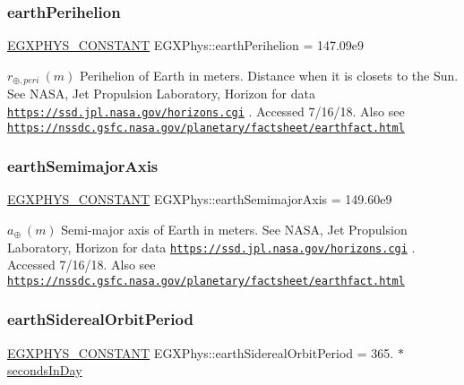 \subsubsection{\texorpdfstring{earth\+Perihelion}{earthPerihelion}}
{\footnotesize\ttfamily \mbox{\hyperlink{group___e_g_x_phys-_constants-_macros_ga76980d288494ce1714c9ac68a95ba702}{E\+G\+X\+P\+H\+Y\+S\+\_\+\+C\+O\+N\+S\+T\+A\+NT}} E\+G\+X\+Phys\+::earth\+Perihelion = 147.\+09e9}

$ r_{\oplus,peri} \ (m)$ Perihelion of Earth in meters. Distance when it is closets to the Sun. See N\+A\+SA, Jet Propulsion Laboratory, Horizon for data \href{https://ssd.jpl.nasa.gov/horizons.cgi}{\tt https\+://ssd.\+jpl.\+nasa.\+gov/horizons.\+cgi} . Accessed 7/16/18. Also see \href{https://nssdc.gsfc.nasa.gov/planetary/factsheet/earthfact.html}{\tt https\+://nssdc.\+gsfc.\+nasa.\+gov/planetary/factsheet/earthfact.\+html} \mbox{\label{group___e_g_x_phys-_constants-_astrophysics-_solar_system-_earth-_orbit_ga639f4ec7fb96c7750f22bfa1bc3a91f9}} 
\subsubsection{\texorpdfstring{earth\+Semimajor\+Axis}{earthSemimajorAxis}}
{\footnotesize\ttfamily \mbox{\hyperlink{group___e_g_x_phys-_constants-_macros_ga76980d288494ce1714c9ac68a95ba702}{E\+G\+X\+P\+H\+Y\+S\+\_\+\+C\+O\+N\+S\+T\+A\+NT}} E\+G\+X\+Phys\+::earth\+Semimajor\+Axis = 149.\+60e9}

$ a_{\oplus} \ (m)$ Semi-\/major axis of Earth in meters. See N\+A\+SA, Jet Propulsion Laboratory, Horizon for data \href{https://ssd.jpl.nasa.gov/horizons.cgi}{\tt https\+://ssd.\+jpl.\+nasa.\+gov/horizons.\+cgi} . Accessed 7/16/18. Also see \href{https://nssdc.gsfc.nasa.gov/planetary/factsheet/earthfact.html}{\tt https\+://nssdc.\+gsfc.\+nasa.\+gov/planetary/factsheet/earthfact.\+html} \mbox{\label{group___e_g_x_phys-_constants-_astrophysics-_solar_system-_earth-_orbit_ga5322620bd6fa94e24b08279f65d07ea2}} 
\subsubsection{\texorpdfstring{earth\+Sidereal\+Orbit\+Period}{earthSiderealOrbitPeriod}}
{\footnotesize\ttfamily \mbox{\hyperlink{group___e_g_x_phys-_constants-_macros_ga76980d288494ce1714c9ac68a95ba702}{E\+G\+X\+P\+H\+Y\+S\+\_\+\+C\+O\+N\+S\+T\+A\+NT}} E\+G\+X\+Phys\+::earth\+Sidereal\+Orbit\+Period = 365. $\ast$ \mbox{\hyperlink{namespace_e_g_x_phys_a93d2a00d75411b58cbf63ab3fd1f8bc2}{seconds\+In\+Day}}}

